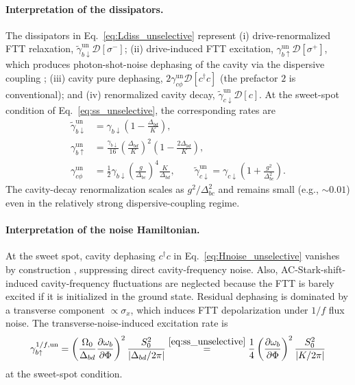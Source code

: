 \paragraph{Interpretation of the dissipators.}
The dissipators in Eq.~\eqref{eq:Ldiss_unselective} represent (i) drive-renormalized FTT relaxation,
$\widetilde{\gamma}_{b\downarrow}^{\mathrm{un}}\mathcal{D}[\sigma^-]$; (ii) drive-induced FTT excitation,
$\gamma_{b\uparrow}^{\mathrm{un}}\mathcal{D}[\sigma^+]$, which produces photon-shot-noise dephasing of the cavity via the dispersive coupling \cite{shotnoise,PhysRevA.75.042302Ashphotonshot}; (iii) cavity pure dephasing,
$2\gamma_{c\phi}^{\mathrm{un}}\mathcal{D}[c^\dagger c]$ (the prefactor $2$ is conventional); and (iv) renormalized cavity decay,
$\widetilde{\gamma}_{c\downarrow}^{\mathrm{un}}\mathcal{D}[c]$.
At the sweet-spot condition of Eq.~\eqref{eq:ss_unselective}, the corresponding rates are
\begin{align}
\widetilde{\gamma}_{b\downarrow}^{\mathrm{un}}
&= \gamma_{b\downarrow}\left(1-\frac{\Delta_{bd}}{K}\right), \nonumber\\
\gamma_{b\uparrow}^{\mathrm{un}}
&= \frac{\gamma_{b\downarrow}}{16}\left(\frac{\Delta_{bd}}{K}\right)^2
\left(1-\frac{2\Delta_{bd}}{K}\right), \nonumber\\
\gamma_{c\phi}^{\mathrm{un}}
&= \frac{1}{2}\gamma_{b\downarrow}\left(\frac{g}{\Delta_{bc}}\right)^4\frac{K}{\Delta_{bd}}, \qquad
\widetilde{\gamma}_{c\downarrow}^{\mathrm{un}}
= \gamma_{c\downarrow}\left(1+\frac{g^2}{\Delta_{bc}^2}\right).
\end{align}
The cavity-decay renormalization scales as $g^2/\Delta_{bc}^2$ and remains small (e.g., $\sim 0.01$) even in the relatively strong dispersive-coupling regime.

\paragraph{Interpretation of the noise Hamiltonian.}
At the sweet spot, cavity dephasing $c^\dagger c$ in Eq.~\eqref{eq:Hnoise_unselective} vanishes by construction , suppressing direct cavity-frequency noise. Also, AC-Stark-shift-induced cavity-frequency fluctuations are neglected because the FTT is barely excited if it is initialized in the ground state. Residual dephasing is dominated by a transverse component $\propto\sigma_x$, which induces FTT depolarization under $1/f$ flux noise. The transverse-noise-induced excitation rate is
\begin{equation}
\gamma_{b\uparrow}^{1/f,\mathrm{un}}=\left(\frac{\Omega_0}{\Delta_{bd}}\frac{\partial\omega_b}{\partial\Phi}\right)^2\frac{S_0^2}{|\Delta_{bd}/2\pi|}
\overset{\eqref{eq:ss_unselective}}{=}\frac{1}{4}\left(\frac{\partial\omega_b}{\partial\Phi}\right)^2\frac{S_0^2}{|K/2\pi|}
\end{equation}
at the sweet-spot condition.

